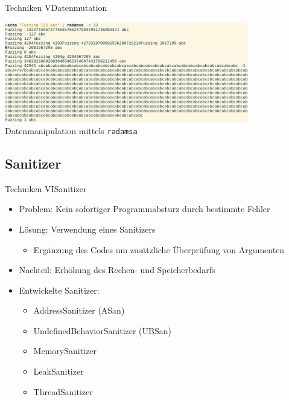 \documentclass[ngerman,aspectratio=1610,12pt]{beamer}
\begin{document}
\begin{frame}{Techniken V}{Datenmutation\\}
  \begin{center}
    \includegraphics[width=0.8\textwidth]{images/radamsa}
    Datenmanipulation mittels \texttt{radamsa} 
  \end{center}
  
\end{frame}


\subsection*{Sanitizer}
\begin{frame}{Techniken VI}{Sanitizer\\}
  \begin{itemize}
    \item Problem: Kein sofortiger Programmabsturz durch bestimmte Fehler
    \item Lösung: Verwendung eines Sanitizers
    \begin{itemize}
      \item Ergänzung des Codes um zusätzliche Überprüfung von Argumenten
    \end{itemize} 
    \item Nachteil: Erhöhung des Rechen- und Speicherbedarfs
    \item Entwickelte Sanitizer:
    \begin{itemize}
      \item AddressSanitizer (ASan) %
      \item UndefinedBehaviorSanitizer (UBSan)%
      \item MemorySanitizer %
      \item LeakSanitizer %
      \item ThreadSanitizer %
    \end{itemize}
  \end{itemize}
\end{frame}
\end{document}
